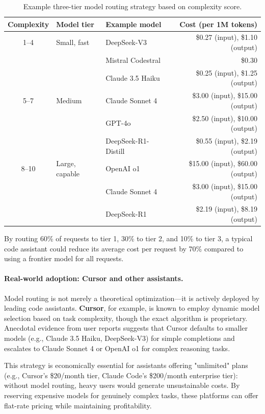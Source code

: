 \documentclass[english]{article}
\begin{document}
\begin{table}[H]
\centering
\caption{Example three-tier model routing strategy based on complexity score.}
\label{tab:model_routing_tiers}
\begin{tabular}{|c|l|l|r|}
\hline
\textbf{Complexity} & \textbf{Model tier} & \textbf{Example model} & \textbf{Cost (per 1M tokens)} \\
\hline
1--4 & Small, fast & DeepSeek-V3 & \$0.27 (input), \$1.10 (output) \\
     &             & Mistral Codestral & \$0.30 \\
     &             & Claude 3.5 Haiku & \$0.25 (input), \$1.25 (output) \\
\hline
5--7 & Medium & Claude Sonnet 4 & \$3.00 (input), \$15.00 (output) \\
     &        & GPT-4o & \$2.50 (input), \$10.00 (output) \\
     &        & DeepSeek-R1-Distill & \$0.55 (input), \$2.19 (output) \\
\hline
8--10 & Large, capable & OpenAI o1 & \$15.00 (input), \$60.00 (output) \\
      &                & Claude Sonnet 4 & \$3.00 (input), \$15.00 (output) \\
      &                & DeepSeek-R1 & \$2.19 (input), \$8.19 (output) \\
\hline
\end{tabular}
\end{table}

By routing 60\% of requests to tier 1, 30\% to tier 2, and 10\% to tier 3, a typical code assistant could reduce its average cost per request by 70\% compared to using a frontier model for all requests.

\paragraph{Real-world adoption: Cursor and other assistants.}

Model routing is not merely a theoretical optimization—it is actively deployed by leading code assistants. \textbf{Cursor}, for example, is known to employ dynamic model selection based on task complexity, though the exact algorithm is proprietary. Anecdotal evidence from user reports suggests that Cursor defaults to smaller models (e.g., Claude 3.5 Haiku, DeepSeek-V3) for simple completions and escalates to Claude Sonnet 4 or OpenAI o1 for complex reasoning tasks.

This strategy is economically essential for assistants offering "unlimited" plans (e.g., Cursor's \$20/month tier, Claude Code's \$200/month enterprise tier): without model routing, heavy users would generate unsustainable costs. By reserving expensive models for genuinely complex tasks, these platforms can offer flat-rate pricing while maintaining profitability.
\end{document}
